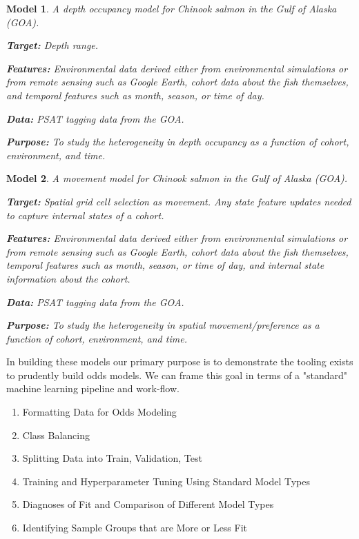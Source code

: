 \documentclass[11pt]{article}
\newtheorem{model}{Model}
\begin{document}
\begin{model}
A depth occupancy model for Chinook salmon in the Gulf of Alaska (GOA). \newline

\textbf{Target:} Depth range. \newline

\textbf{Features:} Environmental data derived either from environmental simulations or from remote sensing such as Google Earth, cohort data about the fish themselves, and temporal features such as month, season, or time of day. \newline

\textbf{Data:} PSAT tagging data from the GOA. \newline 

\textbf{Purpose:} To study the heterogeneity in depth occupancy as a function of cohort, environment, and time.  
\end{model}

\begin{model}
A movement model for Chinook salmon in the Gulf of Alaska (GOA). \newline

\textbf{Target:} Spatial grid cell selection as movement. Any state feature updates needed to capture internal states of a cohort. \newline

\textbf{Features:} Environmental data derived either from environmental simulations or from remote sensing such as Google Earth, cohort data about the fish themselves, temporal features such as month, season, or time of day, and internal state information about the cohort. \newline

\textbf{Data:} PSAT tagging data from the GOA. \newline

\textbf{Purpose:} To study the heterogeneity in spatial movement/preference as a function of cohort, environment, and time.\newline

\end{model}

In building these models our primary purpose is to demonstrate the tooling exists to prudently build odds models. We can frame this goal in terms of a "standard" machine learning pipeline and work-flow. 

\begin{enumerate}
\item Formatting Data for Odds Modeling 
\item Class Balancing
\item Splitting Data into Train, Validation, Test
\item Training and Hyperparameter Tuning Using Standard Model Types
\item Diagnoses of Fit and Comparison of Different Model Types
\item Identifying Sample Groups that are More or Less Fit
\end{enumerate}
\end{document}
